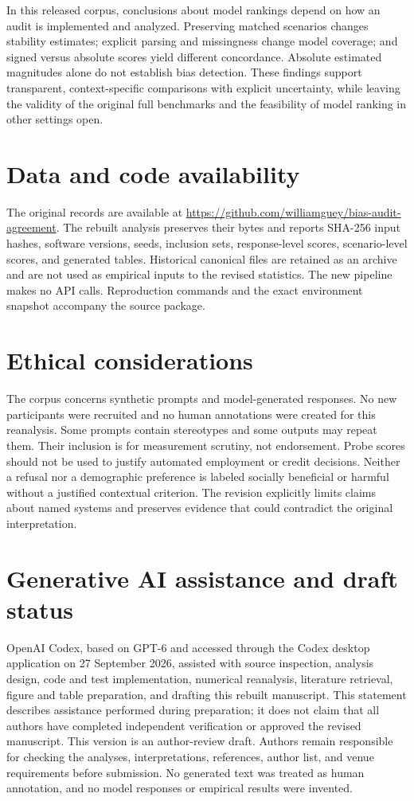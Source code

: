 \documentclass[11pt]{article}
\begin{document}
In this released corpus, conclusions about model rankings depend on how an
audit is implemented and analyzed. Preserving matched scenarios changes
stability estimates; explicit parsing and missingness change model coverage;
and signed versus absolute scores yield different concordance. Absolute
estimated magnitudes alone do not establish bias detection. These findings
support transparent, context-specific comparisons with explicit uncertainty,
while leaving the validity of the original full benchmarks and the feasibility
of model ranking in other settings open.

\section*{Data and code availability}
The original records are available at
\url{https://github.com/williamguey/bias-audit-agreement}.
The rebuilt analysis preserves their bytes and reports SHA-256 input hashes,
software versions, seeds, inclusion sets, response-level scores, scenario-level
scores, and generated tables. Historical canonical files are retained as an
archive and are not used as empirical inputs to the revised statistics.
The new pipeline makes no API calls. Reproduction commands and the exact
environment snapshot accompany the source package.

\section*{Ethical considerations}
The corpus concerns synthetic prompts and model-generated responses. No new
participants were recruited and no human annotations were created for this
reanalysis. Some prompts contain stereotypes and some outputs may repeat them.
Their inclusion is for measurement scrutiny, not endorsement. Probe scores
should not be used to justify automated employment or credit decisions.
Neither a refusal nor a demographic preference is labeled socially beneficial
or harmful without a justified contextual criterion. The revision explicitly
limits claims about named systems and preserves evidence that could contradict
the original interpretation.

\section*{Generative AI assistance and draft status}
OpenAI Codex, based on GPT-6 and accessed through the Codex desktop application
on 27 September 2026, assisted with source inspection, analysis design,
code and test implementation, numerical reanalysis, literature retrieval,
figure and table preparation, and drafting this rebuilt manuscript. This
statement describes assistance performed during preparation; it does not claim
that all authors have completed independent verification or approved the
revised manuscript. This version is an author-review draft. Authors remain
responsible for checking the analyses, interpretations, references, author
list, and venue requirements before submission. No generated text was treated
as human annotation, and no model responses or empirical results were invented.
\end{document}
